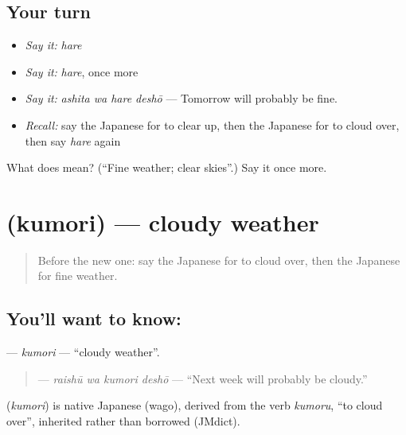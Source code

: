 \subsection*{Your turn}
\begin{itemize}
\raggedright
  \item \emph{Say it:} \emph{hare}
  \item \emph{Say it:} \emph{hare}, once more
  \item \emph{Say it:} \emph{ashita wa hare deshō} — Tomorrow will probably be fine.
  \item \emph{Recall:} say the Japanese for to clear up, then the Japanese for to cloud over, then say \emph{hare} again
\end{itemize}

\begin{tcolorbox}[breakable,colback=teal!4,colframe=teal!35!black,title={Before you move on}]
What does  mean? (\textquotedblleft{}Fine weather; clear skies\textquotedblright{}.) Say it once more.
\end{tcolorbox}
\section[\texorpdfstring{\ja{くもり} (kumori)}{くもり (kumori)}]{ (kumori) — cloudy weather}

\label{lesson:JA-C208-kumori}



\begin{quote}
Before the new one: say the Japanese for to cloud over, then the Japanese for fine weather.
\end{quote}

\subsection*{You'll want to know: }
\textbf{} — \emph{kumori} — \textquotedblleft{}cloudy weather\textquotedblright{}.

\begin{quote}
\textbf{ } — \emph{raishū wa kumori deshō} — \textquotedblleft{}Next week will probably be cloudy.\textquotedblright{}
\end{quote}

\begin{cousinweb}
\textbf{} (\emph{kumori}) is native Japanese (wago), derived from the verb \emph{kumoru}, \textquotedblleft{}to cloud over\textquotedblright{}, inherited rather than borrowed (JMdict).
\end{cousinweb}

